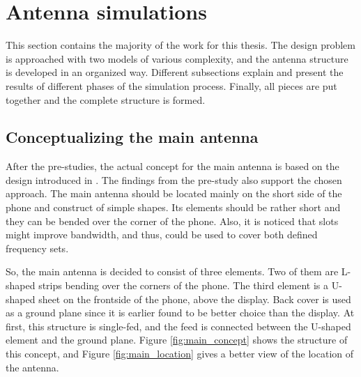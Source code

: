\section{Antenna simulations}
\label{sec:simulations}
This section contains the majority of the work for this thesis. The design problem is approached with two models of various complexity, and the antenna structure is developed in an organized way. Different subsections explain and present the results of different phases of the simulation process. Finally, all pieces are put together and the complete structure is formed.


\subsection{Conceptualizing the main antenna}
\label{sec:conceptualizing}
After the pre-studies, the actual concept for the main antenna is based on the design introduced in \cite{kimmo}. The findings from the pre-study also support the chosen approach. The main antenna should be located mainly on the short side of the phone and construct of simple shapes. Its elements should be rather short and they can be bended over the corner of the phone. Also, it is noticed that slots might improve bandwidth, and thus, could be used to cover both defined frequency sets. 

So, the main antenna is decided to consist of three elements. Two of them are L-shaped strips bending over the corners of the phone. The third element is a U-shaped sheet on the frontside of the phone, above the display. Back cover is used as a ground plane since it is earlier found to be better choice than the display. At first, this structure is single-fed, and the feed is connected between the U-shaped element and the ground plane. Figure \ref{fig:main_concept} shows the structure of this concept, and Figure \ref{fig:main_location} gives a better view of the location of the antenna.

